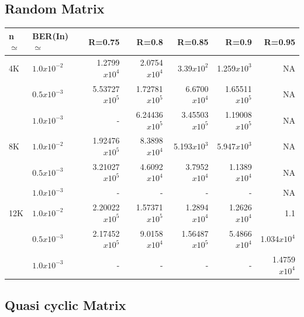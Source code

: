 \documentclass[twopage,12pt,a4paper]{report}
\begin{document}
\begin{raggedright}
\subsection{Random Matrix}

\begin{center}
\begin{tabular}{|l|l|r|r|r|r|r|}
\hline
n$\simeq$   & BER(In)$\simeq$    & R=0.75  & R=0.8   & R=0.85  & R=0.9 & R=0.95 \\ \hline
4K  & $1.0x10^{-2}$  &  1.2799$x10^{4}$   & 2.0754$x10^{4}$  & 3.39$x10^{2}$ & 1.259$x10^{3}$ & NA      
\\ 
    & $0.5x10^{-3}$  &  5.53727$x10^{5}$  &  1.72781$x10^{5}$& 6.6700$x10^{4}$ & 1.65511$x10^{5}$ & NA   
\\ 
    & $1.0x10^{-3}$  & -			      & 6.24436$x10^{5}$& 3.45503$x10^{5}$& 1.19008$x10^{5}$  & NA  
\\ \hline
8K  & $1.0x10^{-2}$  & 1.92476$x10^{5}$   & 8.3898$x10^{4}$  & 5.193$x10^{3}$ & 5.947$x10^{3}$         & NA      \\ 
    & $0.5x10^{-3}$ & 3.21027$x10^{5}$    & 4.6092$x10^{4}$& 3.7952$x10^{4}$ & 1.1389$x10^{4}$ & NA  
\\ 
    & $1.0x10^{-3}$ & -				     & -  				 & -         	  & -    & NA             
\\ \hline
12K & $1.0x10^{-2}$ & 2.20022$x10^{5}$   & 1.57371$x10^{5}$  & 1.2894$x10^{4}$ & 1.2626$x10^{4}$     & 1.1      \\ 
    & $0.5x10^{-3}$ & 2.17452$x10^{5}$   & 9.0158$x10^{4}$& 1.56487$x10^{5}$& 5.4866$x10^{4}$ & 1.034$x10^{4}$    \\ 
    & $1.0x10^{-3}$ & -				     & -   & -			  			 & -     & 1.4759$x10^{4}$   \\ \hline
\end{tabular}
\end{center}


\subsection{Quasi cyclic Matrix}


\end{raggedright}
\end{document}
